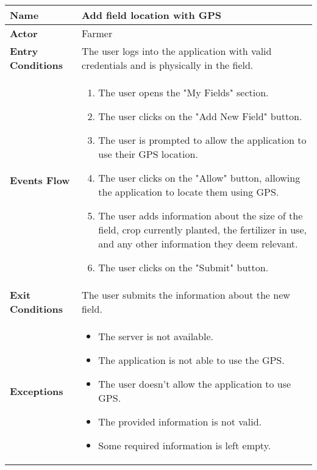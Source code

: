 \begin{center}
\renewcommand{\arraystretch}{1.25}
\begin{tabular}{|l|>{\raggedright\arraybackslash}m{12cm}|}

    \hline
    \textbf{Name} & Add field location with GPS\\
    \hline
   	\textbf{Actor} & Farmer\\
    \hline
    \textbf{Entry Conditions} & The user logs into the application with valid credentials and is physically in the field.\\
    \hline
    \textbf{Events Flow} & 
    		\begin{enumerate}
    			\item The user opens the "My Fields" section.
    			\item The user clicks on the "Add New Field" button.
    			\item The user is prompted to allow the application to use their GPS location.
    			\item The user clicks on the "Allow" button, allowing the application to locate them using GPS.
    			\item The user adds information about the size of the field, crop currently planted, the fertilizer in use, and any other information they deem relevant.
    			\item The user clicks on the "Submit" button.
    		\end{enumerate}
    	\\
    \hline
    \textbf{Exit Conditions} & The user submits the information about the new field.\\
    \hline
    \textbf{Exceptions} & 
    		\begin{itemize}
    			\item The server is not available.
    			\item The application is not able to use the GPS.
    			\item The user doesn't allow the application to use GPS.
    			\item The provided information is not valid.
    			\item Some required information is left empty.
    		\end{itemize}
    \\
    \hline
\end{tabular}
\end{center}